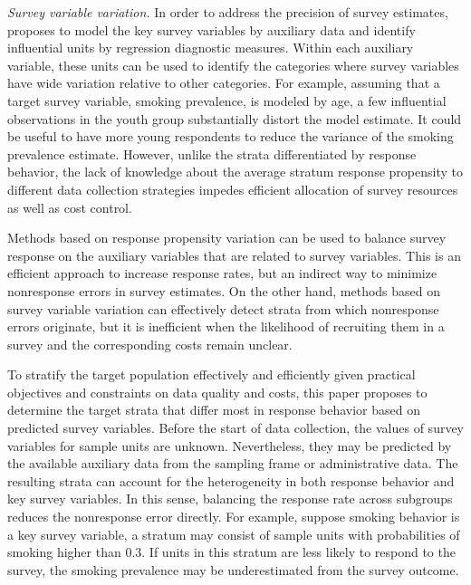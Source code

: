\documentclass[11pt]{article}
\begin{document}
{\em Survey variable variation.}
In order to address the precision of survey estimates,  proposes to model the key survey variables by auxiliary data and identify influential units by regression diagnostic measures. 
Within each auxiliary variable, these units can be used to identify the categories where survey variables have wide variation relative to other categories. 
For example, assuming that a target survey variable, smoking prevalence, is modeled by age, a few influential observations in the youth group substantially distort the model estimate.
It could be useful to have more young respondents to reduce the variance of the smoking prevalence estimate. 
However, unlike the strata differentiated by response behavior, the lack of knowledge about the average stratum response propensity to different data collection strategies impedes efficient allocation of survey resources as well as cost control.

Methods based on response propensity variation can be used to balance survey response on the auxiliary variables that are related to survey variables. This is an efficient approach to increase response rates, but an indirect way to minimize nonresponse errors in survey estimates. 
On the other hand, methods based on survey variable variation can effectively detect strata from which nonresponse errors originate, but it is inefficient when the likelihood of recruiting them in a survey and the corresponding costs remain unclear.

To stratify the target population effectively and efficiently given practical objectives and constraints on data quality and costs, this paper proposes to determine the target strata that differ most in response behavior based on predicted survey variables. 
Before the start of data collection, the values of survey variables for sample units are unknown. 
Nevertheless, they may be predicted by the available auxiliary data from the sampling frame or administrative data.
The resulting strata can account for the heterogeneity in both response behavior and key survey variables. 
In this sense, balancing the response rate across subgroups reduces the nonresponse error directly. 
For example, suppose smoking behavior is a key survey variable, a stratum may consist of sample units with probabilities of smoking higher than 0.3. 
If units in this stratum are less likely to respond to the survey, the smoking prevalence may be underestimated from the survey outcome.
\end{document}
